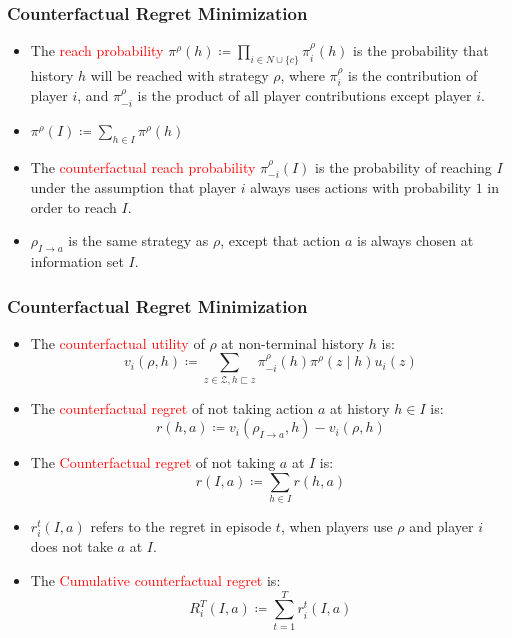 \documentclass[UTF8,11pt,colorlinks,compress,openany]{beamer}%
\begin{document}
\begin{frame}\frametitle{Counterfactual Regret Minimization}
\begin{itemize}
	\item The \textcolor{red}{reach probability} $\pi^\rho(h)\coloneqq\prod\limits_{i\in N\cup\{c\}}\pi_i^\rho(h)$ is the probability that history $h$ will be reached with strategy $\rho$, where $\pi_i^\rho$ is the contribution of player $i$, and $\pi_{-i}^\rho$ is the product of all player contributions except player $i$.
	\item $\pi^\rho(I)\coloneqq \sum\limits_{h\in I}\pi^\rho(h)$
	\item The \textcolor{red}{counterfactual reach probability} $\pi_{-i}^\rho(I)$ is the probability of reaching $I$ under the assumption that player $i$ always uses actions with probability $1$ in order to reach $I$.
	\item $\rho_{I\to a}$ is the same strategy as $\rho$, except that action $a$ is always chosen at information set $I$.
\end{itemize}
\end{frame}

\begin{frame}\frametitle{Counterfactual Regret Minimization}
\begin{itemize}
	\item The \textcolor{red}{counterfactual utility} of $\rho$ at non-terminal history $h$ is:
	\[v_i(\rho,h)\coloneqq \sum\limits_{z\in\mathcal{Z},h\sqsubset z}\pi_{-i}^\rho(h)\pi^\rho(z\mid h)u_i(z)\]
	\item The \textcolor{red}{counterfactual regret} of not taking action $a$ at history $h\in I$ is:
	\[r(h,a)\coloneqq v_i(\rho_{I\to a},h)-v_i(\rho,h)\]
	\item The \textcolor{red}{Counterfactual regret} of not taking $a$ at $I$ is:
	\[r(I,a)\coloneqq \sum\limits_{h\in I}r(h,a)\]
	\item $r_i^t(I,a)$ refers to the regret in episode $t$, when players use $\rho$ and player $i$ does not take $a$ at $I$.
	\item The \textcolor{red}{Cumulative counterfactual regret} is:
	\[R_i^T(I,a)\coloneqq \sum\limits_{t=1}^T r_i^t(I,a)\]
\end{itemize}
\end{frame}
\end{document}
